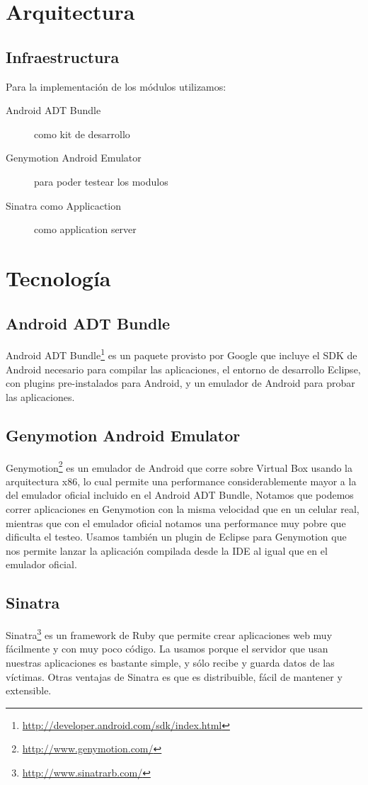 \section{Arquitectura}
\subsection{Infraestructura}
Para la implementaci\'on de los m\'odulos utilizamos:

\begin{description}
    \item[Android ADT Bundle] como kit de desarrollo
    \item[Genymotion Android Emulator ] para poder testear los modulos
    \item[Sinatra como Applicaction ] como application server
\end{description}
\section{Tecnología}
	\subsection{Android ADT Bundle} 
		Android ADT Bundle\footnote{ \url{http://developer.android.com/sdk/index.html}} es un paquete provisto por Google que incluye el SDK de Android necesario para compilar las aplicaciones, el entorno de desarrollo Eclipse, con plugins pre-instalados para Android, y un emulador de Android para probar las aplicaciones.
		
	\subsection{Genymotion Android Emulator}
		Genymotion\footnote{\url{http://www.genymotion.com/}} es un emulador de Android que corre sobre Virtual Box usando la arquitectura x86, lo cual permite una performance considerablemente mayor a la del emulador oficial incluido en el Android ADT Bundle, Notamos que podemos correr aplicaciones en Genymotion con la misma velocidad que en un celular real, mientras que con el emulador oficial notamos una performance muy pobre que dificulta el testeo. Usamos también un plugin de Eclipse para Genymotion que nos permite lanzar la aplicación compilada desde la IDE al igual que en el emulador oficial.
		
	\subsection{Sinatra}
		Sinatra\footnote{\url{http://www.sinatrarb.com/}} es un framework de Ruby que permite crear aplicaciones web muy fácilmente y con muy poco código. La usamos porque el servidor que usan nuestras aplicaciones es bastante simple, y sólo recibe y guarda datos de las víctimas. Otras ventajas de Sinatra es que es distribuible, fácil de mantener y extensible.
